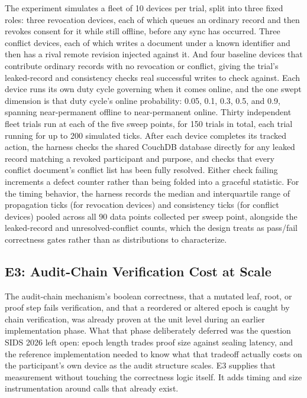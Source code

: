 The experiment simulates a fleet of 10 devices per trial, split into three fixed roles: three revocation devices, each of which queues an ordinary record and then revokes consent for it while still offline, before any sync has occurred. Three conflict devices, each of which writes a document under a known identifier and then has a rival remote revision injected against it. And four baseline devices that contribute ordinary records with no revocation or conflict, giving the trial's leaked-record and consistency checks real successful writes to check against. Each device runs its own duty cycle governing when it comes online, and the one swept dimension is that duty cycle's online probability: 0.05, 0.1, 0.3, 0.5, and 0.9, spanning near-permanent offline to near-permanent online. Thirty independent fleet trials run at each of the five sweep points, for 150 trials in total, each trial running for up to 200 simulated ticks. After each device completes its tracked action, the harness checks the shared CouchDB database directly for any leaked record matching a revoked participant and purpose, and checks that every conflict document's conflict list has been fully resolved. Either check failing increments a defect counter rather than being folded into a graceful statistic. For the timing behavior, the harness records the median and interquartile range of propagation ticks (for revocation devices) and consistency ticks (for conflict devices) pooled across all 90 data points collected per sweep point, alongside the leaked-record and unresolved-conflict counts, which the design treats as pass/fail correctness gates rather than as distributions to characterize.

\subsection{E3: Audit-Chain Verification Cost at Scale}

The audit-chain mechanism's boolean correctness, that a mutated leaf, root, or proof step fails verification, and that a reordered or altered epoch is caught by chain verification, was already proven at the unit level during an earlier implementation phase. What that phase deliberately deferred was the question SIDS 2026 left open: epoch length trades proof size against sealing latency, and the reference implementation needed to know what that tradeoff actually costs on the participant's own device as the audit structure scales. E3 supplies that measurement without touching the correctness logic itself. It adds timing and size instrumentation around calls that already exist.


